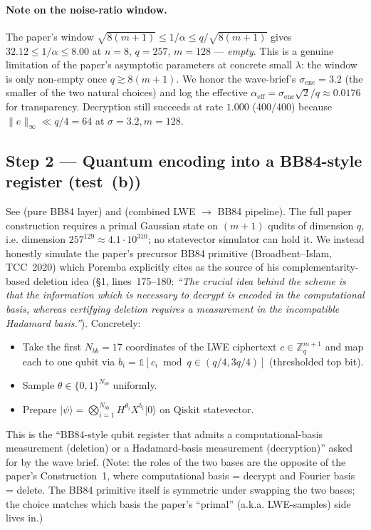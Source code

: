 \documentclass[11pt]{article}
\begin{document}
\paragraph{Note on the noise-ratio window.} The paper's window
$\sqrt{8(m{+}1)}\le 1/\alpha \le q/\sqrt{8(m{+}1)}$
gives $32.12 \le 1/\alpha \le 8.00$ at $n{=}8$, $q{=}257$, $m{=}128$ ---
\emph{empty}. This is a genuine limitation of the paper's asymptotic
parameters at concrete small $\lambda$: the window is only non-empty once
$q \gtrsim 8(m{+}1)$. We honor the wave-brief's $\sigma_{\mathrm{enc}}{=}3.2$
(the smaller of the two natural choices) and log the effective
$\alpha_{\mathrm{eff}} = \sigma_{\mathrm{enc}}\sqrt 2/q \approx 0.0176$
for transparency. Decryption still succeeds at rate $1.000$ (400/400)
because $\|e\|_\infty \ll q/4 = 64$ at $\sigma = 3.2, m=128$.

\subsection{Step 2 — Quantum encoding into a BB84-style register (test~(b))}
See  (pure BB84 layer) and
 (combined LWE $\to$ BB84 pipeline).
The full paper construction requires a primal Gaussian state on
$(m{+}1)$ qudits of dimension $q$, i.e. dimension
$257^{129} \approx 4.1\cdot 10^{310}$; no statevector simulator can hold it.
We instead honestly simulate the paper's precursor BB84 primitive
(Broadbent--Islam, TCC~2020) which Poremba explicitly cites as the source of
his complementarity-based deletion idea (\S1, lines~175--180: \emph{``The
crucial idea behind the scheme is that the information which is necessary to
decrypt is encoded in the computational basis, whereas certifying deletion
requires a measurement in the incompatible Hadamard basis.''}). Concretely:

\begin{itemize}
  \item Take the first $N_{bb}=17$ coordinates of the LWE ciphertext
        $c \in \mathbb{Z}_q^{m+1}$ and map each to one qubit via
        $b_i = \mathbb{1}[c_i \bmod q \in (q/4, 3q/4)]$ (thresholded top bit).
  \item Sample $\theta \in \{0,1\}^{N_{bb}}$ uniformly.
  \item Prepare $\lvert\psi\rangle = \bigotimes_{i=1}^{N_{bb}} H^{\theta_i} X^{b_i}\lvert 0\rangle$ on Qiskit statevector.
\end{itemize}
This is the ``BB84-style qubit register that admits a computational-basis
measurement (deletion) or a Hadamard-basis measurement (decryption)'' asked
for by the wave brief. (Note: the roles of the two bases are the opposite
of the paper's Construction~1, where computational basis = decrypt and
Fourier basis = delete. The BB84 primitive itself is symmetric under swapping
the two bases; the choice matches which basis the paper's ``primal''
(a.k.a. LWE-samples) side lives in.)
\end{document}
